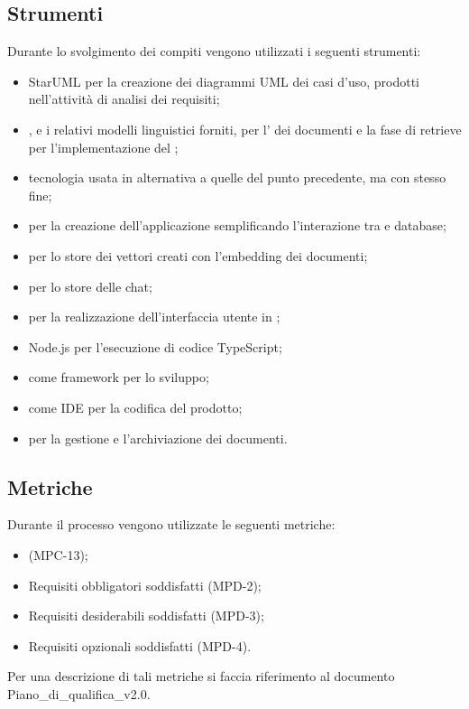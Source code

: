 \subsection{Strumenti}
Durante lo svolgimento dei compiti vengono utilizzati i seguenti strumenti:
\begin{itemize}
    \item StarUML per la creazione dei diagrammi UML dei casi d'uso, prodotti nell'attività di analisi dei requisiti;
    \item {}, e i relativi modelli linguistici forniti, per l' dei documenti e la fase di retrieve per l'implementazione del ;
    \item {} tecnologia usata in alternativa a quelle del punto precedente, ma con stesso fine;
    \item {} per la creazione dell'applicazione semplificando l'interazione tra  e database;
    \item {} per lo store dei vettori creati con l'embedding dei documenti;
    \item {} per lo store delle chat;
    \item {} per la realizzazione dell'interfaccia utente in ;
    \item Node.js per l'esecuzione di codice TypeScript;
    \item {} come framework per lo sviluppo;
    \item {} come IDE per la codifica del prodotto;
    \item {} per la gestione e l'archiviazione dei documenti.
\end{itemize}

\subsection{Metriche}
Durante il processo vengono utilizzate le seguenti metriche:
\begin{itemize}
    \item {} (MPC-13);
    \item Requisiti obbligatori soddisfatti (MPD-2);
    \item Requisiti desiderabili soddisfatti (MPD-3);
    \item Requisiti opzionali soddisfatti (MPD-4).
\end{itemize}
Per una descrizione di tali metriche si faccia riferimento al documento Piano\_di\_qualifica\_v2.0.
\newpage


